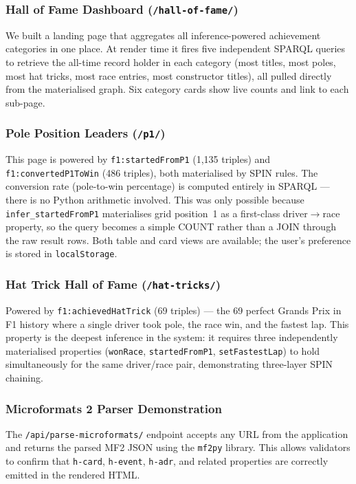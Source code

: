 \documentclass[12pt,a4paper]{article}
\begin{document}
\subsubsection{Hall of Fame Dashboard (\texttt{/hall-of-fame/})}

We built a landing page that aggregates all inference-powered achievement categories
in one place. At render time it fires five independent SPARQL queries to retrieve
the all-time record holder in each category (most titles, most poles, most hat tricks,
most race entries, most constructor titles), all pulled directly from the materialised
graph. Six category cards show live counts and link to each sub-page.

\subsubsection{Pole Position Leaders (\texttt{/p1/})}

This page is powered by \texttt{f1:startedFromP1} (1{,}135 triples) and
\texttt{f1:convertedP1ToWin} (486 triples), both materialised by SPIN rules.
The conversion rate (pole-to-win percentage) is computed entirely in SPARQL ---
there is no Python arithmetic involved. This was only possible because
\texttt{infer\_startedFromP1} materialises grid position~1 as a first-class
driver$\to$race property, so the query becomes a simple COUNT rather than a JOIN
through the raw result rows. Both table and card views are available; the
user's preference is stored in \texttt{localStorage}.

\subsubsection{Hat Trick Hall of Fame (\texttt{/hat-tricks/})}

Powered by \texttt{f1:achievedHatTrick} (69 triples) --- the 69 perfect Grands Prix
in F1 history where a single driver took pole, the race win, and the fastest lap.
This property is the deepest inference in the system: it requires three independently
materialised properties (\texttt{wonRace}, \texttt{startedFromP1},
\texttt{setFastestLap}) to hold simultaneously for the same driver/race pair,
demonstrating three-layer SPIN chaining.

\subsubsection{Microformats 2 Parser Demonstration}

The \texttt{/api/parse-microformats/} endpoint accepts any URL from the application
and returns the parsed MF2 JSON using the \texttt{mf2py} library.
This allows validators to confirm that \texttt{h-card}, \texttt{h-event},
\texttt{h-adr}, and related properties are correctly emitted in the rendered HTML.
\end{document}
